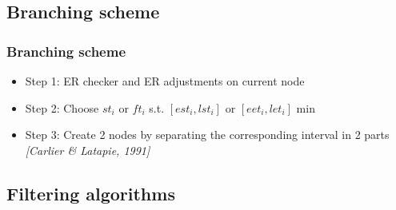 \subsection{Branching scheme}

\begin{frame}
  \frametitle{Branching scheme }
  \begin{itemize}
    \vfill
  \item Step 1: ER checker and ER adjustments on current node 
    \vfill    
\pause
  \item Step 2: Choose $st_i$ or $ft_i$ s.t. $[est_i,lst_i]$ or
    $[eet_i,let_i]$ min
    \vfill
\pause
  \item Step 3: Create 2 nodes by separating the corresponding
    interval in 2 parts  {\small \it \color{gray!50!black!50} [Carlier
      \& Latapie, 1991]} 
  \end{itemize}
  \begin{overlayarea}{\textwidth}{4cm}
  \end{overlayarea}
  \vfill
\end{frame}

\subsection{Filtering algorithms}

